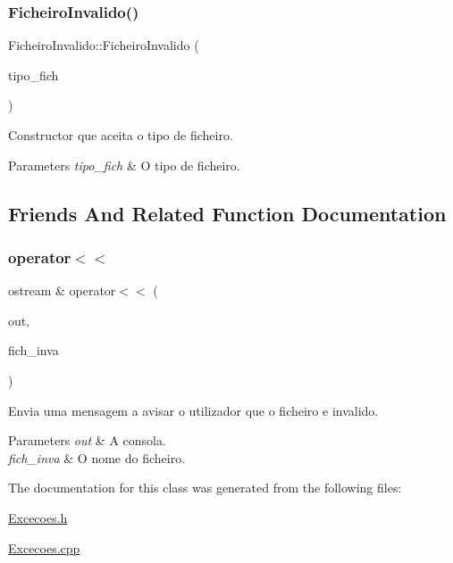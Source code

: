 \subsubsection{\texorpdfstring{Ficheiro\+Invalido()}{FicheiroInvalido()}}
{\footnotesize\ttfamily Ficheiro\+Invalido\+::\+Ficheiro\+Invalido (\begin{DoxyParamCaption}\item[{string}]{tipo\+\_\+fich }\end{DoxyParamCaption})}



Constructor que aceita o tipo de ficheiro. 


\begin{DoxyParams}{Parameters}
{\em tipo\+\_\+fich} & O tipo de ficheiro. \\
\hline
\end{DoxyParams}


\subsection{Friends And Related Function Documentation}
\hypertarget{class_ficheiro_invalido_a150983c019491c5ea124515a0d9845bd}{}\label{class_ficheiro_invalido_a150983c019491c5ea124515a0d9845bd} 
\subsubsection{\texorpdfstring{operator$<$$<$}{operator<<}}
{\footnotesize\ttfamily ostream \& operator$<$$<$ (\begin{DoxyParamCaption}\item[{ostream \&}]{out,  }\item[{const \hyperlink{class_ficheiro_invalido}{Ficheiro\+Invalido} \&}]{fich\+\_\+inva }\end{DoxyParamCaption})\hspace{0.3cm}{\ttfamily [friend]}}



Envia uma mensagem a avisar o utilizador que o ficheiro e invalido. 


\begin{DoxyParams}{Parameters}
{\em out} & A consola. \\
\hline
{\em fich\+\_\+inva} & O nome do ficheiro. \\
\hline
\end{DoxyParams}


The documentation for this class was generated from the following files\+:\begin{DoxyCompactItemize}
\item 
\hyperlink{_excecoes_8h}{Excecoes.\+h}\item 
\hyperlink{_excecoes_8cpp}{Excecoes.\+cpp}\end{DoxyCompactItemize}
